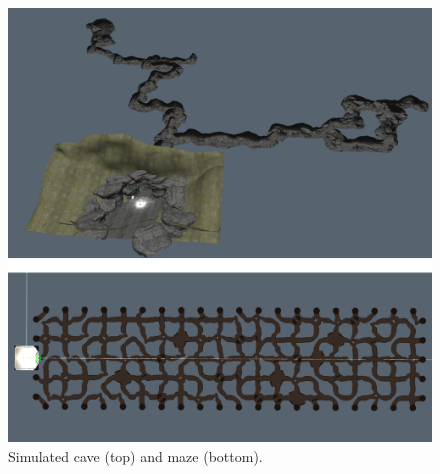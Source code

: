 \documentclass[letterpaper]{article} %
\begin{document}
\begin{figure}
    \centering
     	\includegraphics[width=0.63\columnwidth]{IRM_Planning/figures/together.png}
    \caption{Simulated cave (top) and maze (bottom).}
    \label{fig:maps_of_cave}
\end{figure}



\clearpage{}

\small

\normalsize






\clearpage{}




\end{document}
